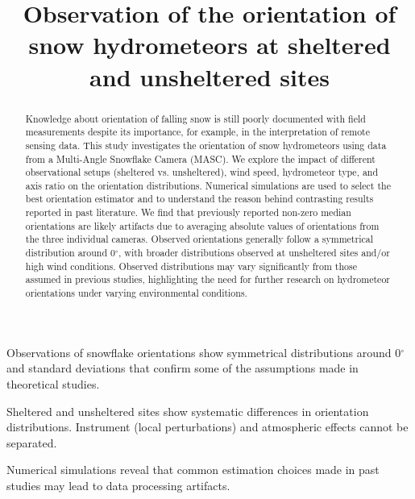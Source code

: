 \documentclass[draft]{agujournal2019}
\begin{document}
\title{Observation of the orientation  of snow hydrometeors at sheltered and unsheltered sites}






\begin{keypoints}
\item Observations of snowflake orientations show symmetrical distributions around 0$^\circ$ and standard deviations that confirm some of the assumptions made in theoretical studies. 
\item Sheltered and unsheltered sites show systematic differences in orientation distributions. Instrument (local perturbations) and atmospheric effects cannot be separated.
\item Numerical simulations reveal that common estimation choices made in past studies may lead to data processing artifacts.
\end{keypoints}



\begin{abstract}
Knowledge about orientation of falling snow is still poorly documented with field measurements despite its importance, for example, in the interpretation of remote sensing data. This study investigates the orientation of snow hydrometeors using data from a Multi-Angle Snowflake Camera (MASC). We explore the impact of different observational setups (sheltered vs. unsheltered), wind speed, hydrometeor type, and axis ratio on the orientation distributions. Numerical simulations are used to select the best orientation estimator and to understand the reason behind contrasting results reported in past literature. We find that previously reported non-zero median orientations are likely artifacts due to averaging absolute values of orientations from the three individual cameras. Observed orientations generally follow a symmetrical distribution around 0$^\circ$, with broader distributions observed at unsheltered sites and/or high wind conditions.  Observed distributions may vary significantly from those assumed in previous studies, highlighting the need for further research on hydrometeor orientations under varying environmental conditions.
\end{abstract}
\end{document}
